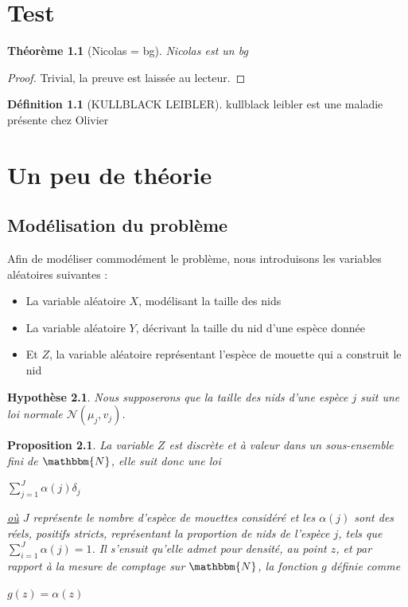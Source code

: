 \documentclass[frenchb]{report}
\newcommand{\N}{\mathbbm{N}}
\newcommand{\1}{\mathbbm{1}}
\newcommand{\n}{\mathcal{N}}
\newtheorem{prop}{Proposition}
\newtheorem{thm}{Théorème}
\newtheorem{hyp}{Hypothèse}
\theoremstyle{definition}\newtheorem{defn}{Définition}
\theoremstyle{definition}\newtheorem{exm}{Exemple}
\theoremstyle{definition}\newtheorem{rem}{Remarque}
\begin{document}
\chapter{Test}

\begin{thm}[Nicolas = bg]
Nicolas est un bg
\end{thm}
\begin{proof}
Trivial, la preuve est laissée au lecteur.
\end{proof}

\begin{defn}[KULLBLACK LEIBLER]
kullblack leibler est une maladie présente chez Olivier
\end{defn}


\pagebreak


\chapter{Un peu de théorie}

\section{Modélisation du problème}
Afin de modéliser commodément le problème, nous introduisons les variables aléatoires suivantes :

\begin{itemize}[label=\adfflowerleft]
	\item La variable aléatoire $X$, modélisant la taille des nids
	\item La variable aléatoire $Y$, décrivant la taille du nid d'une espèce donnée
	\item Et $Z$, la variable aléatoire représentant l'espèce de mouette qui a construit le nid
\end{itemize}

\begin{hyp}
Nous supposerons que la taille des nids d'une espèce $j$ suit une loi normale $\n(\mu_j,v_j)$. 
\end{hyp}

\begin{prop}
La variable $Z$ est discrète et à valeur dans un sous-ensemble fini de $\N$, elle suit donc une loi 
\begin{center} $\displaystyle \sum_{j=1}^J \alpha(j)\delta_j$ \end{center}
\underline{où} $J$ représente le nombre d'espèce de mouettes considéré et les $\alpha(j)$ sont des réels, positifs stricts, représentant la proportion de nids de l'espèce $j$, tels que $\displaystyle\sum_{i=1}^J \alpha(j) = 1$. \newline
Il s'ensuit qu'elle admet pour densité, au point $z$, et par rapport à la mesure de comptage sur $\N$, la fonction $g$ définie comme 
\begin{center} $g(z) = \alpha(z)$ \end{center}
\end{prop}
\end{document}

